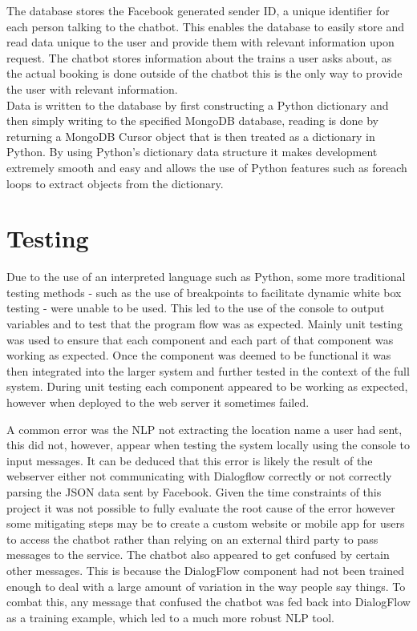 \documentclass[12pt,a4paper]{article}
\begin{document}
    The database stores the Facebook generated sender ID, a unique identifier for each person talking to the chatbot. This enables the database to easily store and read data unique to the user and provide them with relevant information upon request. The chatbot stores information about the trains a user asks about, as the actual booking is done outside of the chatbot this is the only way to provide the user with relevant information. \\
    
    Data is written to the database by first constructing a Python dictionary and then simply writing to the specified MongoDB database, reading is done by returning a MongoDB Cursor object that is then treated as a dictionary in Python. By using Python's dictionary data structure it makes development extremely smooth and easy and allows the use of Python features such as foreach loops to extract objects from the dictionary.
    
    \section{Testing}
    \label{section:testing}
    
    Due to the use of an interpreted language such as Python, some more traditional testing methods - such as the use of breakpoints to facilitate dynamic white box testing - were unable to be used. This led to the use of the console to output variables and to test that the program flow was as expected.
    Mainly unit testing was used to ensure that each component and each part of that component was working as expected. Once the component was deemed to be functional it was then integrated into the larger system and further tested in the context of the full system.
    During unit testing each component appeared to be working as expected, however when deployed to the web server it sometimes failed. 
    
    A common error was the NLP not extracting the location name a user had sent, this did not, however, appear when testing the system locally using the console to input messages. It can be deduced that this error is likely the result of the webserver either not communicating with Dialogflow correctly or not correctly parsing the JSON data sent by Facebook. Given the time constraints of this project it was not possible to fully evaluate the root cause of the error however some mitigating steps may be to create a custom website or mobile app for users to access the chatbot rather than relying on an external third party to pass messages to the service. The chatbot also appeared to get confused by certain other messages. This is because the DialogFlow component had not been trained enough to deal with a large amount of variation in the way people say things. To combat this, any message that confused the chatbot was fed back into DialogFlow as a training example, which led to a much more robust NLP tool.
    
\end{document}
